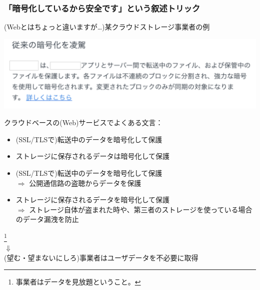\documentclass[12pt,dvipdfmx]{beamer}
\begin{document}
\begin{frame}
\frametitle{「暗号化しているから安全です」という叙述トリック}

\begin{block}{\small (Webとはちょっと違いますが…)某クラウドストレージ事業者の例}
\begin{center}
\includegraphics[width=0.8\linewidth]{Figs/storage_enc.pdf}
\end{center} 
\end{block}

クラウドベースの(Web)サービスでよくある文言：
\begin{itemize}
 \item (SSL/TLSで)転送中のデータを暗号化して保護
 \item ストレージに保存されるデータは暗号化して保護
\end{itemize}
\end{frame}

\begin{frame}
\begin{itemize}
 \item (SSL/TLSで)転送中のデータを暗号化して保護\\
 $\Rightarrow$ 公開通信路の盗聴からデータを保護
 \item ストレージに保存されるデータを暗号化して保護\\
 $\Rightarrow$ ストレージ自体が盗まれた時や、第三者のストレージを使っている場合のデータ漏洩を防止%
\end{itemize}
\begin{center}
 \footnote[frame]{事業者はデータを見放題ということ。}\\
 $\Downarrow$\\
 \alert{(望む・望まないにしろ)事業者はユーザデータを不必要に取得}
\end{center}
\end{frame}
\end{document}
